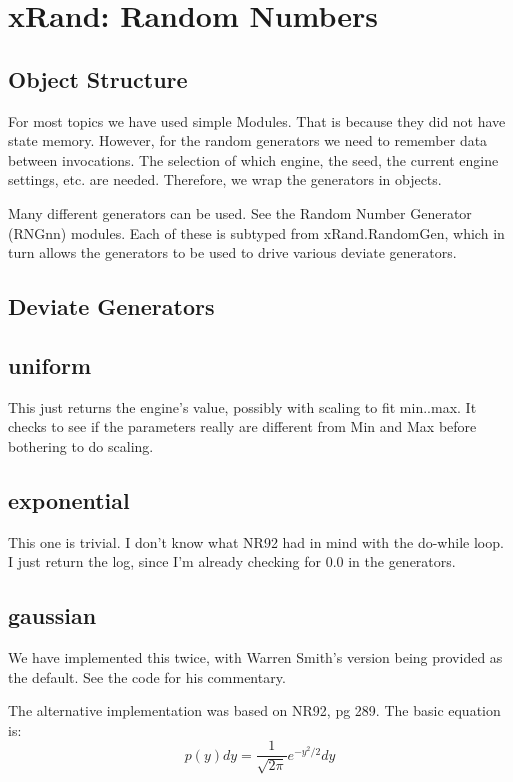 \section{xRand: Random Numbers}
\subsection{Object Structure}
For most topics we have used simple Modules.  
That is because they did not have state memory.  However, for
the random generators we need to remember data between invocations.  The
selection of which engine, the seed, the current engine settings, etc.
are needed.  Therefore, we wrap the generators in objects.

Many different generators can be used.  See the Random Number Generator
(RNGnn) modules.  Each of these is subtyped from xRand.RandomGen, which
in turn allows the generators to be used to drive various
deviate generators.

\subsection{Deviate Generators}

\subsection*{uniform}
This just returns the engine's value, possibly with scaling to fit
min..max.  It checks to see if the parameters really are different
from Min and Max before bothering to do scaling.

\subsection*{exponential}
This one is trivial.  I don't know what NR92 had in
mind with the do-while loop.  I just return the log, since
I'm already checking for 0.0 in the generators.

\subsection*{gaussian}
We have implemented this twice, with Warren Smith's version being
provided as the default. See the code for his commentary.  

The alternative implementation was based on NR92, pg 289.
The basic equation is:
\begin{equation}
  p(y)dy = \frac{1}{\sqrt{2\pi}}e^{-y^2/2}dy
\end{equation}


